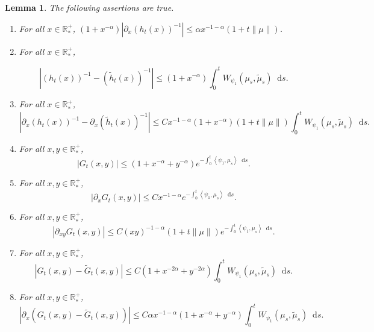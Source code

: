 \documentclass[11pt,a4paper]{article}
\newcommand{\RRP}{\mathbb{R}^+_*}
\newcommand{\brac}[1]{\left\langle#1\right\rangle}
\newcommand{\dd}{\mathop{}\!\mathrm{d}}
\newtheorem{lemma}[theorem]{Lemma}
\begin{document}
\begin{lemma}\label{lem:technical_G_h}
    The following assertions are true.
    \begin{enumerate}[label=(\roman*)]
        \item For all $x \in \RRP$, $(1 + x^{-\alpha})\left|\partial_x \left( h_t(x)\right)^{-1} \right|\leq \alpha x^{-1-\alpha}\left(1 + t\|\mu\| \right) $.
        \item For all $x \in \RRP$, 
        
        \[\left|\left( h_t(x)\right)^{-1}-\left( \tilde{h}_t(x)\right)^{-1} \right|\leq (1 + x^{-\alpha})\int_0^t W_{\psi_1}(\mu_s,\tilde{\mu}_s) \dd s. \]
        \item For all $x \in \RRP$,
        \[
            \left|\partial_x \left( h_t(x)\right)^{-1}- \partial_x\left( \tilde{h}_t(x)\right)^{-1} \right|\leq Cx^{-1-\alpha} (1 + x^{-\alpha})\left(1 + t\|\mu\| \right) \int_0^t W_{\psi_1}(\mu_s,\tilde{\mu}_s) \dd s.
         \]
        \item For all $x,y \in \RRP$, 
        \[|G_t(x,y)| \leq (1 + x^{-\alpha}+ y^{-\alpha})e^{-\int_0^t \brac{\psi_1,\mu_s}\dd s}.
        \]
        \item For all $x,y \in \RRP$, 
        \[\left|\partial_x G_t(x,y) \right| \leq C   x^{-1-\alpha} e^{-\int_0^t \brac{\psi_1,\mu_s}\dd s}.
        \]
        \item For all $x,y \in \RRP$, 
        \[ \left|\partial_{xy}G_t(x,y) \right| \leq C(xy)^{-1-\alpha} \left(1 + t\|\mu\| \right) e^{-\int_0^t \brac{\psi_1,\mu_s}\dd s}.
        \]
        \item For all $x,y \in \RRP$,
        \[\left|G_t(x,y)- \tilde{G}_t(x,y)\right| \leq C(1 + x^{-2\alpha} + y^{-2\alpha})\int_0^t W_{\psi_1}(\mu_s,\tilde{\mu}_s) \dd s .
        \]
        \item For all $x,y \in \RRP$, 
        \[\left|\partial_x \left(G_t(x,y)- \tilde{G}_t(x,y)\right)  \right| \leq C\alpha x^{-1-\alpha}(1 + x^{-\alpha} + y^{-\alpha})\int_0^t W_{\psi_1}(\mu_s,\tilde{\mu}_s) \dd s.
        \]
    \end{enumerate}
\end{lemma}
\end{document}
